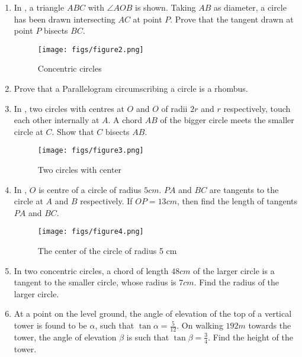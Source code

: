 \documentclass{article}
\theoremstyle{remark}
\begin{document}
\begin{enumerate}[label=\arabic*.,ref=\theenumi]
    \item  In , a triangle $ABC$ with $\angle AOB$ is shown. Taking $AB$ as diameter, a circle has been drawn intersecting $AC$ at point $P$. Prove that the tangent drawn at point $P$ bisects $BC$. 
	        \begin{figure}[H]
        \texttt{[image: figs/figure2.png]}
        \caption{Concentric circles}
        \label{fig:fig2.png}
               \end{figure}
    \item  Prove that a Parallelogram circumscribing a circle is a rhombus.
     \item  In , two circles with centres at $O$ and $O$ of radii $2r$ and $r$ respectively, touch each other internally at $A$. A chord $AB$ of the bigger circle meets the smaller circle at $C$. Show that  $C$ bisects $AB$.
    \begin{figure}[H]
        \centering
        \texttt{[image: figs/figure3.png]}
        \caption{Two circles with center}
        \label{fig:fig3.png}
    \end{figure}  
    
    \item In , $O$ is centre of a circle of radius $5 cm$. $PA$ and $BC$ are tangents to the circle at $A$ and $B$ respectively. If $OP = 13 cm$, then find the length of tangents $PA$ and $BC$.
     \begin{figure}[H]
        \centering
        \texttt{[image: figs/figure4.png]}
        \caption{The center of the circle of radius 5 cm}
	     \label{fig:fig4.png}
    \end{figure}
    
    \item In two concentric circles, a chord of length $48 cm$ of the larger
circle is a tangent to the smaller circle, whose radius is $7 cm$. Find the radius of the larger circle. 
    \item At a point on the level ground, the angle of elevation of the top
of a vertical tower is found to be $\alpha$, such that $\tan \alpha =\frac{5}{12} $. On walking $192 m$ towards the tower, the angle of elevation $\beta$ is such that $\tan \beta=\frac{3}{4}$. Find the height of the tower. 
    \end{enumerate}
\end{document}
